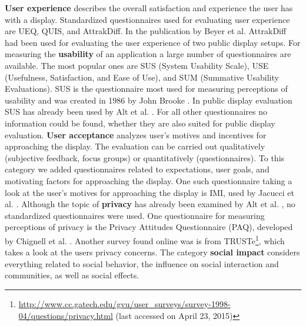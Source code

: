 	\textbf{User experience} describes the overall satisfaction and experience the user has with a display. Standardized questionnaires used for evaluating user experience are UEQ, QUIS, and AttrakDiff. In the publication by Beyer et al. \cite{Beyer2011} AttrakDiff had been used for evaluating the user experience of two public display setups.
	For measuring the \textbf{usability} of an application a large number of questionnaires are available. The most popular ones are SUS (System Usability Scale), USE (Usefulness, Satisfaction, and Ease of Use), and SUM (Summative Usability Evaluations). SUS is the questionnaire most used for measuring perceptions of usability and was created in 1986 by John Brooke \cite{SUSQuestionnaire}. In public display evaluation SUS has already been used by Alt et al. \cite{alt2011digifieds}. For all other questionnaires no information could be found, whether they are also suited for public display evaluation.
	\textbf{User acceptance} analyzes user's motives and incentives for approaching the display. The evaluation can be carried out qualitatively (subjective feedback, focus groups) or quantitatively (questionnaires). To this category we added questionnaires related to expectations, user goals, and motivating factors for approaching the display. One such questionnaire taking a look at the user's motives for approaching the display is IMI, used by Jacucci et al. \cite{jacucci2010worldsofinformation}.
	Although the topic of \textbf{privacy} has already been examined by Alt et al. \cite{alt2011digifieds}, no standardized questionnaires were used. One questionnaire for measuring perceptions of privacy is the Privacy Attitudes Questionnaire (PAQ), developed by Chignell et al. \cite{chignell2003privacy}. Another survey found online was is from TRUSTe\footnote{\url{http://www.cc.gatech.edu/gvu/user_surveys/survey-1998-04/questions/privacy.html} (last accessed on April 23, 2015)}, which takes a look at the users privacy concerns.
		The category \textbf{social impact} considers everything related to social behavior, the influence on social interaction and communities, as well as social effects.

